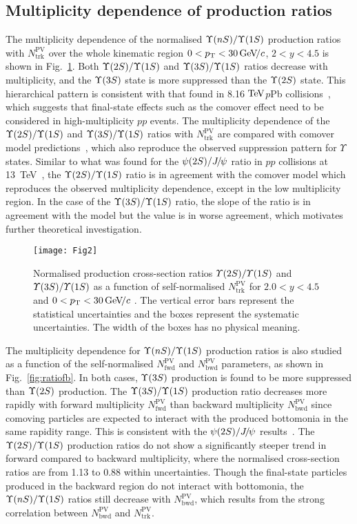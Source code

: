 \documentclass[12pt,a4paper]{article}
\def\pvt{N_{\mathrm{trk}}^{\mathrm{PV}}}
\def\bkt{N_{\mathrm{bwd}}^{\mathrm{PV}}}
\def\fwt{N_{\mathrm{fwd}}^{\mathrm{PV}}}
\def\Ppsi        {\ensuremath{\uppsi}\xspace}
\def\PUpsilon    {\ensuremath{\Upsilon}\xspace}
\def\PJ      {\ensuremath{\mathrm{J}}\xspace}
\def\Ppsi        {\ensuremath{\psi}\xspace}
\def\PJ      {\ensuremath{J}\xspace}
\def\jpsi     {{\ensuremath{{\PJ\mskip -3mu/\mskip -2mu\Ppsi}}}\xspace}
\newcommand{\aunit}[1]{\ensuremath{\text{\,#1}}}
\newcommand{\tev}{\aunit{Te\kern -0.1em V}\xspace}
\newcommand{\gevc}{\ensuremath{\aunit{Ge\kern -0.1em V\!/}c}\xspace}
\def\pt         {\ensuremath{p_{\mathrm{T}}}\xspace}
\begin{document}
\subsection{Multiplicity dependence of production ratios}
The multiplicity dependence of the normalised $\Yn{n}/\Yn{1}$ production ratios with $\pvt$ over the whole kinematic region $0<\pt<30\gevc$, $2<y<4.5$ is shown in Fig.~\ref{fig:ratiot}.
Both $\Yn{2}/\Yn{1}$ and $\Yn{3}/\Yn{1}$ ratios decrease with multiplicity, and the $\Yn{3}$ state is more suppressed than the $\Yn{2}$ state. 
This hierarchical pattern is consistent with that found in 8.16\,\tev $p$Pb collisions~\cite{LHCb:2018psc}, which suggests that final-state effects such as the comover effect need to be considered in high-multiplicity $pp$ events. 
The multiplicity dependence of the $\Yn{2}/\Yn{1}$ and $\Yn{3}/\Yn{1}$ ratios with $\pvt$ are compared with comover model predictions~\cite{Ferreiro:2012rq}, which also reproduce the observed suppression pattern for $\PUpsilon$ states.
Similar to what was found for the $\psi(2S)/\jpsi$ ratio in $pp$ collisions at 13~TeV~\cite{LHCb:2023xie}, the $\Yn{2}/\Yn{1}$ ratio is in agreement with the comover model which reproduces the observed multiplicity dependence, except in the low multiplicity region. In the case of the $\Yn{3}/\Yn{1}$ ratio, the slope of the ratio is in agreement with the model but the value is in worse agreement, which motivates further theoretical investigation.
\begin{figure}[!tbp]
\centering
\begin{minipage}[t]{0.7\textwidth}
\centering
\texttt{[image: Fig2]}
\end{minipage}
\caption{Normalised production cross-section ratios $\mit\Upsilon(\mathrm{2}S)/\mit\Upsilon(\mathrm{1}S)$ and $\mit\Upsilon(\mathrm{3}S)/\mit\Upsilon(\mathrm{1}S)$ as a function of self-normalised $N_{\mathrm{trk}}^{\mathrm{PV}}$ for $2.0<y<4.5$ and $0<\pt<30 \text{\,Ge\kern -0.1em V\!}/c$ . The vertical error bars represent the statistical uncertainties and the boxes represent the systematic uncertainties. The width of the boxes has no physical meaning.} 
\label{fig:ratiot}
\end{figure}

The multiplicity dependence for $\Yn{n}/\Yn{1}$ production ratios is also studied as a function of the self-normalised $\fwt$ and $\bkt$ parameters, as shown in Fig.~\ref{fig:ratiofb}. In both cases, $\Yn{3}$ production is found to be more suppressed than $\Yn{2}$ production. The $\Yn{3}/\Yn{1}$ production ratio decreases more rapidly with forward multiplicity $\fwt$ than backward multiplicity $\bkt$ since comoving particles are expected to interact with the produced bottomonia in the same rapidity range. This is consistent with the $\psi(2S)/\jpsi$ results~\cite{LHCb:2023xie}. The $\Yn{2}/\Yn{1}$ production ratios do not show a significantly steeper trend in forward compared to backward multiplicity, where the normalised cross-section ratios are from 1.13 to 0.88 within uncertainties. Though the final-state particles produced in the backward region do not interact with bottomonia, the $\Yn{n}/\Yn{1}$ ratios still decrease with $\bkt$, which results from the strong correlation between $\bkt$ and $\pvt$.
\end{document}

